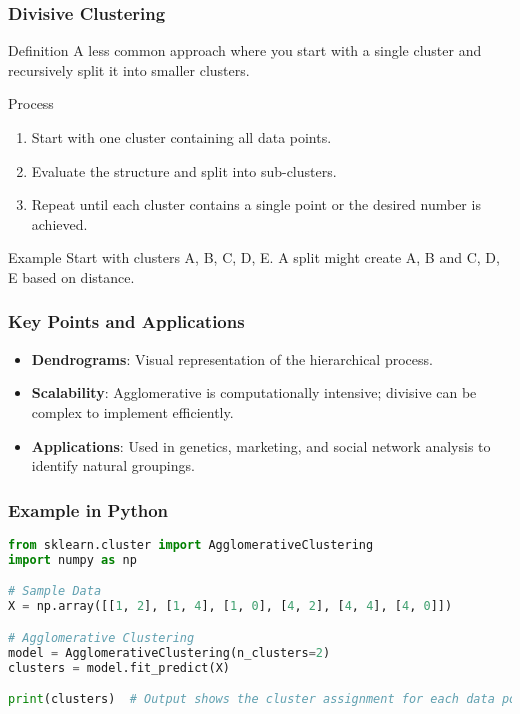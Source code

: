 \documentclass{beamer}
\begin{document}
\begin{frame}[fragile]
    \frametitle{Divisive Clustering}
    \begin{block}{Definition}
        A less common approach where you start with a single cluster and recursively split it into smaller clusters.
    \end{block}
    
    \begin{block}{Process}
        \begin{enumerate}
            \item Start with one cluster containing all data points.
            \item Evaluate the structure and split into sub-clusters.
            \item Repeat until each cluster contains a single point or the desired number is achieved.
        \end{enumerate}
    \end{block}
    
    \begin{block}{Example}
       Start with clusters {A, B, C, D, E}. A split might create {A, B} and {C, D, E} based on distance.
    \end{block}
\end{frame}

\begin{frame}[fragile]
    \frametitle{Key Points and Applications}
    \begin{itemize}
        \item \textbf{Dendrograms}: Visual representation of the hierarchical process.
        \item \textbf{Scalability}: Agglomerative is computationally intensive; divisive can be complex to implement efficiently.
        \item \textbf{Applications}: Used in genetics, marketing, and social network analysis to identify natural groupings.
    \end{itemize}
\end{frame}

\begin{frame}[fragile]
    \frametitle{Example in Python}
    \begin{lstlisting}[language=Python]
from sklearn.cluster import AgglomerativeClustering
import numpy as np

# Sample Data
X = np.array([[1, 2], [1, 4], [1, 0], [4, 2], [4, 4], [4, 0]])

# Agglomerative Clustering
model = AgglomerativeClustering(n_clusters=2)
clusters = model.fit_predict(X)

print(clusters)  # Output shows the cluster assignment for each data point
    \end{lstlisting}
\end{frame}
\end{document}
